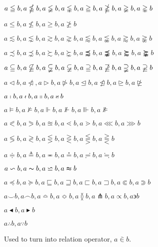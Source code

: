 {\LARGE
    $ a \leqq b, a \nleqq b, a \lneqq b, a \lvertneqq b, 
    a \geqq b, a \ngeqq b, a \gneqq b, a \gvertneqq b $

    $ a \leqslant b, a \nleqslant b, a \geqslant b, a \ngeqslant b $

    $ a \lesssim b, a \lnsim b, a \gtrsim b, a \gnsim b, 
    a \lessapprox b, a \lnapprox b, a \gtrapprox b, a \gnapprox b $

    $ a \precsim b, a \precnsim b, a \succsim b, a \succnsim b, 
    a \precapprox b, a \precnapprox b, a \succapprox b, a \succnapprox b $

    $ a \subseteqq b, a \nsubseteqq b, a \subsetneqq b, a \varsubsetneqq b, 
    a \supseteqq b, a \nsupseteqq b, a \supsetneqq b, a \varsupsetneqq b $

    $ a \vartriangleleft b, a \ntriangleleft, a \vartriangleright b, a \ntriangleright b, 
    a \trianglelefteq b, a \ntrianglelefteq b, a \trianglerighteq b, a \ntrianglerighteq $

    $ a \shortmid b, a \nshortmid b, a \shortparallel b, a \nshortparallel b $

    $ a \vDash b, a \nvDash b, a \Vdash b, a \nVdash b, a \Vvdash b, a \nVDash $
}

\vspace{2em}

{\LARGE
    $ a \eqslantless b, a \eqslantgtr b, a \approxeq b, a \lessdot b, a \gtrdot b, a \lll b, a \ggg b $

    $ a \lessgtr b, a \gtrless b, a \lesseqgtr b, a \gtreqless b, a \lesseqqgtr b, a \gtreqqless b $

    $ a \doteqdot b, a \triangleq b, a \eqcirc b, a \circeq b, a \risingdotseq b, a \fallingdotseq b $

    $ a \backsim b, a \thicksim b, a \backsimeq b, a \thickapprox b $

    $ a \preccurlyeq b, a \succcurlyeq b, a \sqsubseteq b, a \sqsupseteq b, 
    a \sqsubset b, a \sqsupset b, a \Subset b, a \Supset b $

    $ a \smallsmile b, a \smallfrown b, a \bumpeq b, a \Bumpeq b, 
    a \between b, a \pitchfork b, a \varpropto b, a \backepsilon b $

    $ a \blacktriangleleft b, a \blacktriangleright b $

    $ a \therefore b, a \because b $
}

Used to turn into relation operator, $ a \mathrel{\overline{\in}} b $.

